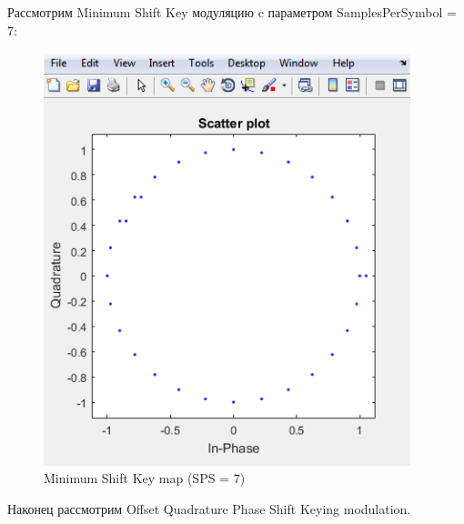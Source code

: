 \documentclass[a4paper,14pt]{extarticle}
\begin{document}
Рассмотрим Minimum Shift Key модуляцию c параметром SamplesPerSymbol = 7:

\begin{figure}[H]
\centering
\includegraphics[width=0.95\textwidth]{msk}
\captionsetup{justification=centering,margin=1.0 cm}
\caption{Minimum Shift Key map (SPS = 7)}
\label{any}
\end{figure}

Наконец рассмотрим Offset Quadrature Phase Shift Keying modulation.
\end{document}
